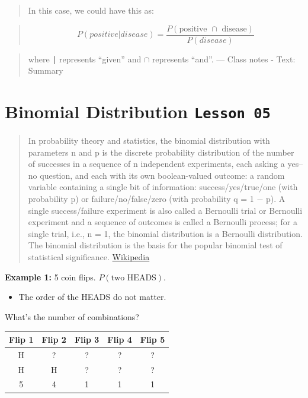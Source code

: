 \documentclass[]{book}
\providecommand{\tightlist}{%
  \setlength{\itemsep}{0pt}\setlength{\parskip}{0pt}}
\begin{document}
\begin{quote}
In this case, we could have this as:
\end{quote}

\begin{quote}
\[P(positive|disease) = \frac{P(\text{positive }\cap\text{ disease})}{P(disease)}\]
\end{quote}

\begin{quote}
where ∣ represents ``given'' and \(\cap\) represents ``and''. --- Class
notes - Text: Summary
\end{quote}

\section{\texorpdfstring{Binomial Distribution
\texttt{Lesson\ 05}}{Binomial Distribution Lesson 05}}\label{binomial-distribution-lesson-05}

\begin{quote}
In probability theory and statistics, the binomial distribution with
parameters n and p is the discrete probability distribution of the
number of successes in a sequence of n independent experiments, each
asking a yes--no question, and each with its own boolean-valued outcome:
a random variable containing a single bit of information:
success/yes/true/one (with probability p) or failure/no/false/zero (with
probability q = 1 − p). A single success/failure experiment is also
called a Bernoulli trial or Bernoulli experiment and a sequence of
outcomes is called a Bernoulli process; for a single trial, i.e., n = 1,
the binomial distribution is a Bernoulli distribution. The binomial
distribution is the basis for the popular binomial test of statistical
significance.
\href{https://en.wikipedia.org/wiki/Binomial_distribution}{Wikipedia}
\end{quote}

\textbf{Example 1:} 5 coin flips. \(P(\text{two HEADS})\).

\begin{itemize}
\tightlist
\item
  The order of the HEADS do not matter.
\end{itemize}

What's the number of combinations?

\begin{longtable}[]{@{}ccccc@{}}
\toprule
Flip 1 & Flip 2 & Flip 3 & Flip 4 & Flip 5\tabularnewline
\midrule
\endhead
H & ? & ? & ? & ?\tabularnewline
H & H & ? & ? & ?\tabularnewline
5 & 4 & 1 & 1 & 1\tabularnewline
\bottomrule
\end{longtable}
\end{document}
